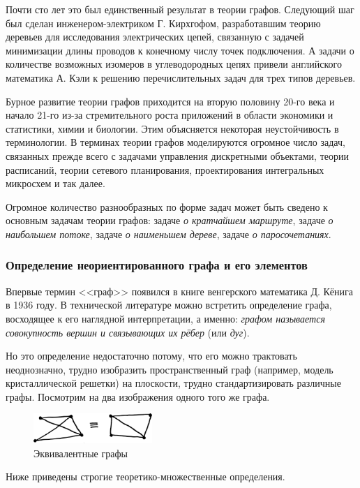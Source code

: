 \documentclass[12pt, a4paper]{article}
\begin{document}
Почти сто лет это был единственный результат в теории графов. Следующий шаг был сделан инженером-электриком Г. Кирхгофом, разработавшим теорию деревьев для исследования электрических цепей, связанную с задачей минимизации длины проводов к конечному числу точек подключения. А задачи о количестве возможных изомеров в углеводородных цепях привели английского математика А. Кэли к решению перечислительных задач для трех типов деревьев.

Бурное развитие теории графов приходится на вторую половину 20-го века и начало 21-го из-за стремительного роста приложений в области экономики и статистики, химии и биологии. Этим объясняется некоторая неустойчивость в терминологии. В терминах теории графов моделируются огромное число задач, связанных прежде всего с задачами управления дискретными объектами, теории расписаний, теории сетевого планирования, проектирования интегральных микросхем и так далее.

Огромное количество разнообразных по форме задач может быть сведено к основным задачам теории графов: задаче \textit{о кратчайшем маршруте}, задаче \textit{о наибольшем потоке}, задаче \textit{о наименьшем дереве}, задаче \textit{о паросочетаниях}.

\subsubsection{Определение неориентированного графа и его элементов}

Впервые термин <<граф>> появился в книге венгерского математика Д. Кёнига в 1936 году. В технической литературе можно встретить определение графа, восходящее к его наглядной интерпретации, а именно: \textit{графом называется совокупность вершин и связывающих их рёбер} (или \textit{дуг}).

Но это определение недостаточно потому, что его можно трактовать неоднозначно, трудно изобразить пространственный граф (например, модель кристаллической решетки) на плоскости, трудно стандартизировать различные графы. Посмотрим на два изображения одного того же графа.

\begin{figure}[h]
 \centering
 \includegraphics[width=0.4\textwidth]{25}
 \vspace{-4mm}
  \caption{Эквивалентные графы}
\end{figure}
Ниже приведены строгие теоретико-множественные определения.
\end{document}
